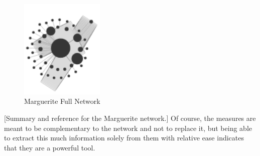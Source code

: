 \begin{figure}[h!]
  \begin{center}
  \includegraphics[trim={0 0 0 0}, width=40mm]{./Figures/margueriteNetwork.png}
  \caption{Marguerite Full Network}
  \label{fig:margueriteNetwork}
  \end{center}
\end{figure}
[Summary and reference for the Marguerite network.]
Of course, the measures are meant to be complementary to the network and not to replace it, but being able to extract this much information solely from them with relative ease indicates that they are a powerful tool.

\pagebreak
